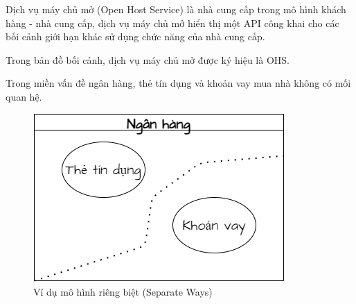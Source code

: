 Dịch vụ máy chủ mở (Open Host Service)  là  nhà cung cấp  trong mô hình khách hàng - nhà cung cấp,   dịch vụ máy chủ mở   hiển thị một API công khai cho  các     bối cảnh giới hạn  khác     sử dụng  chức năng của   nhà cung cấp.

Trong bản đồ    bối cảnh,      dịch vụ máy chủ mở    được ký hiệu là   OHS.




\begin{example} Trong miền vấn đề ngân hàng,     thẻ tín dụng và khoản vay mua nhà không có mối quan hệ. 
    
    \begin{figure}[H]
        
        \centering
        
        \includegraphics[scale = 0.5]{pictures/mo_hinh_rieng_biet_separate_ways/main.drawio.png}
        
        \caption{Ví dụ  mô hình riêng biệt (Separate Ways)  }
        
    \end{figure}
\end{example} 
